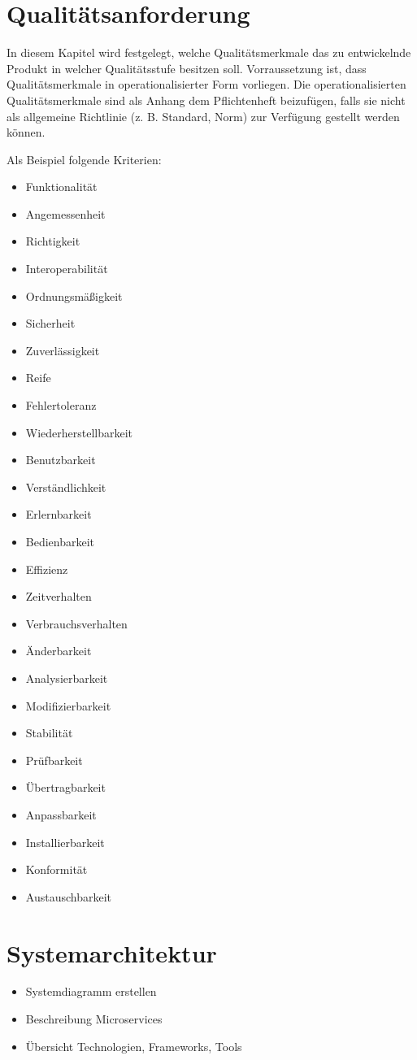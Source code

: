 \documentclass[%
	12pt,
	a4paper,
	oneside,
	parskip=full
]{scrbook}
\begin{document}
\chapter{Qualitätsanforderung}
In diesem Kapitel wird festgelegt, welche Qualitätsmerkmale das zu entwickelnde Produkt in
welcher Qualitätsstufe besitzen soll. Vorraussetzung ist, dass Qualitätsmerkmale in
operationalisierter Form vorliegen. Die operationalisierten Qualitätsmerkmale sind als
Anhang dem Pflichtenheft beizufügen, falls sie nicht als allgemeine Richtlinie (z. B. Standard,
Norm) zur Verfügung gestellt werden können.

Als Beispiel folgende Kriterien:

\begin{itemize}
	\item Funktionalität
	\item Angemessenheit
	\item Richtigkeit
	\item Interoperabilität
	\item Ordnungsmäßigkeit
	\item Sicherheit
	\item Zuverlässigkeit
	\item Reife
	\item Fehlertoleranz
	\item Wiederherstellbarkeit
	\item Benutzbarkeit
	\item Verständlichkeit
	\item Erlernbarkeit
	\item Bedienbarkeit
	\item Effizienz
	\item Zeitverhalten
	\item Verbrauchsverhalten
	\item Änderbarkeit
	\item Analysierbarkeit
	\item Modifizierbarkeit
	\item Stabilität
	\item Prüfbarkeit
	\item Übertragbarkeit
	\item Anpassbarkeit
	\item Installierbarkeit
	\item Konformität
	\item Austauschbarkeit
\end{itemize}

\chapter{Systemarchitektur}
\begin{itemize}
	\item Systemdiagramm erstellen
	\item Beschreibung Microservices
	\item Übersicht Technologien, Frameworks, Tools
\end{itemize}
\end{document}
